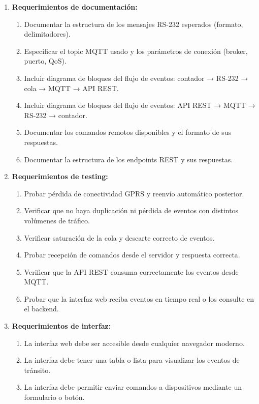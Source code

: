 \documentclass[
11pt, %
]{charter}
\begin{document}
\begin{enumerate}
	\item \textbf{Requerimientos de documentación:}
		\begin{enumerate}
			\item Documentar la estructura de los mensajes RS-232 esperados (formato, delimitadores).
			\item Especificar el topic MQTT usado y los parámetros de conexión (broker, puerto, QoS).
			\item Incluir diagrama de bloques del flujo de eventos: contador → RS-232 → cola → MQTT → API REST.
			\item Incluir diagrama de bloques del flujo de eventos: API REST → MQTT → RS-232 → contador.
			\item  Documentar los comandos remotos disponibles y el formato de sus respuestas.
			\item Documentar la estructura de los endpoints REST y sus respuestas.
		\end{enumerate}

	\item \textbf{Requerimientos de testing:}
		\begin{enumerate}
			\item Probar pérdida de conectividad GPRS y reenvío automático posterior.
			\item Verificar que no haya duplicación ni pérdida de eventos con distintos volúmenes de tráfico.
			\item  Verificar saturación de la cola y descarte correcto de eventos.
			\item  Probar recepción de comandos desde el servidor y respuesta correcta.
			\item  Verificar que la API REST consuma correctamente los eventos desde MQTT.
			\item  Probar que la interfaz web reciba eventos en tiempo real o los consulte en el backend.
		\end{enumerate}
	\item \textbf{Requerimientos de interfaz:}
		\begin{enumerate}
			\item La interfaz web debe ser accesible desde cualquier navegador moderno.
			\item La interfaz debe tener una tabla o lista para visualizar los eventos de tránsito.
			\item La interfaz debe permitir enviar comandos a dispositivos mediante un formulario o botón.
		\end{enumerate}


\end{enumerate}
\end{document}
